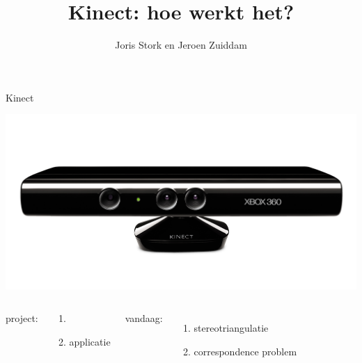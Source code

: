 \documentclass{beamer}
\author{Joris Stork en Jeroen Zuiddam}
\title{Kinect: hoe werkt het?}
\date{}
\begin{document}
\begin{frame}
\titlepage
\end{frame}
\section{}

\begin{frame}{Kinect}{}
\centerline{
\includegraphics[scale=0.3, viewport= 40 120 1190 460, clip=true]{kinect.jpg}
}

\pause
\vfill
\begin{columns}
project:
\begin{enumerate}
\item {}
\item applicatie
\end{enumerate}
\pause
{}
vandaag:
\begin{enumerate}
\item stereotriangulatie
\item correspondence problem
\end{enumerate}
\end{columns}
\end{frame}
\end{document}
